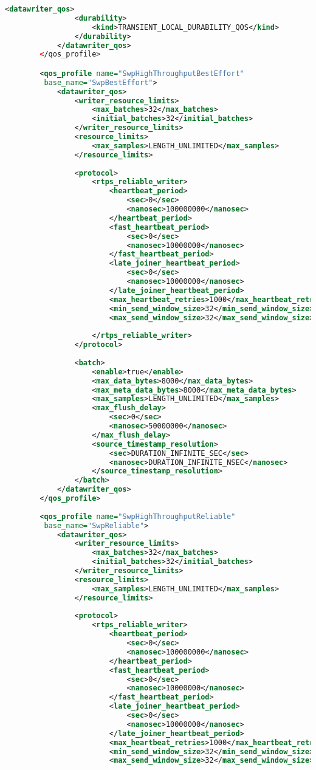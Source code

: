 \begin{lstlisting}[language=XML]
			<datawriter_qos>
				<durability>
					<kind>TRANSIENT_LOCAL_DURABILITY_QOS</kind>
				</durability>
			</datawriter_qos>
		</qos_profile>

		<qos_profile name="SwpHighThroughputBestEffort"
		 base_name="SwpBestEffort">
			<datawriter_qos>
				<writer_resource_limits>
					<max_batches>32</max_batches>
					<initial_batches>32</initial_batches>
				</writer_resource_limits>
				<resource_limits>
					<max_samples>LENGTH_UNLIMITED</max_samples>
				</resource_limits>
		
				<protocol>
					<rtps_reliable_writer>
						<heartbeat_period>
							<sec>0</sec>
							<nanosec>100000000</nanosec>
						</heartbeat_period>
						<fast_heartbeat_period>
							<sec>0</sec>
							<nanosec>10000000</nanosec>
						</fast_heartbeat_period>
						<late_joiner_heartbeat_period>
							<sec>0</sec>
							<nanosec>10000000</nanosec>
						</late_joiner_heartbeat_period>
						<max_heartbeat_retries>1000</max_heartbeat_retries>
						<min_send_window_size>32</min_send_window_size>
						<max_send_window_size>32</max_send_window_size>
					
					</rtps_reliable_writer>
				</protocol>
		
				<batch>
					<enable>true</enable>
					<max_data_bytes>8000</max_data_bytes>
					<max_meta_data_bytes>8000</max_meta_data_bytes>
					<max_samples>LENGTH_UNLIMITED</max_samples>
					<max_flush_delay>
						<sec>0</sec>
						<nanosec>50000000</nanosec>
					</max_flush_delay>
					<source_timestamp_resolution>
						<sec>DURATION_INFINITE_SEC</sec>
						<nanosec>DURATION_INFINITE_NSEC</nanosec>
					</source_timestamp_resolution>
				</batch>
			</datawriter_qos>
		</qos_profile>
		
		<qos_profile name="SwpHighThroughputReliable"
		 base_name="SwpReliable">
			<datawriter_qos>
				<writer_resource_limits>
					<max_batches>32</max_batches>
					<initial_batches>32</initial_batches>
				</writer_resource_limits>
				<resource_limits>
					<max_samples>LENGTH_UNLIMITED</max_samples>
				</resource_limits>
				
				<protocol>
					<rtps_reliable_writer>
						<heartbeat_period>
							<sec>0</sec>
							<nanosec>100000000</nanosec>
						</heartbeat_period>
						<fast_heartbeat_period>
							<sec>0</sec>
							<nanosec>10000000</nanosec>
						</fast_heartbeat_period>
						<late_joiner_heartbeat_period>
							<sec>0</sec>
							<nanosec>10000000</nanosec>
						</late_joiner_heartbeat_period>
						<max_heartbeat_retries>1000</max_heartbeat_retries>
						<min_send_window_size>32</min_send_window_size>
						<max_send_window_size>32</max_send_window_size>
					

\end{lstlisting}

